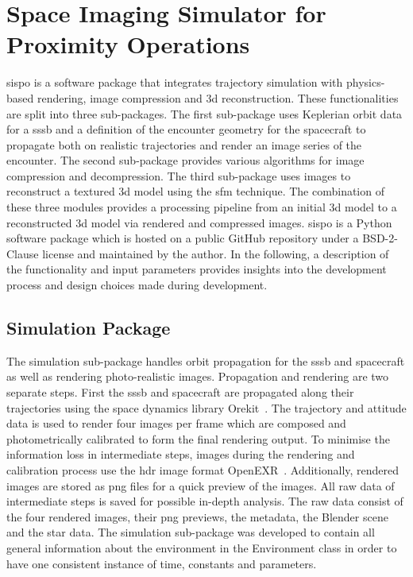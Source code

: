 \section{Space Imaging Simulator for Proximity Operations} \label{sec:sispo}
\gls{sispo} is a software package that integrates trajectory simulation with physics-based rendering, image compression and \gls{3d} reconstruction. These functionalities are split into three sub-packages. The first sub-package uses Keplerian orbit data for a \gls{sssb} and a definition of the encounter geometry for the spacecraft to propagate both on realistic trajectories and render an image series of the encounter. The second sub-package provides various algorithms for image compression and decompression. The third sub-package uses images to reconstruct a textured \gls{3d} model using the \gls{sfm} technique. The combination of these three modules provides a processing pipeline from an initial \gls{3d} model to a reconstructed \gls{3d} model via rendered and compressed images. \Gls{sispo} is a Python software package which is hosted on a public GitHub repository under a BSD-2-Clause license and maintained by the author\cite{Schwarzkopf2020SpaceOperations}. In the following, a description of the functionality and input parameters provides insights into the development process and design choices made during development.

\subsection{Simulation Package}
The simulation sub-package handles orbit propagation for the \gls{sssb} and spacecraft as well as rendering photo-realistic images. Propagation and rendering are two separate steps. First the \gls{sssb} and spacecraft are propagated along their trajectories using the space dynamics library Orekit~\cite{orekit}. The  trajectory and attitude data is used to render four images per frame which are composed and photometrically calibrated to form the final rendering output. To minimise the information loss in intermediate steps, images during the rendering and calibration process use the \gls{hdr} image format OpenEXR~\cite{openexr}. Additionally, rendered images are stored as \gls{png} files for a quick preview of the images. All raw data of intermediate steps is saved for possible in-depth analysis. The raw data consist of the four rendered images, their \gls{png} previews, the metadata, the Blender scene and the star data. The simulation sub-package was developed to contain all general information about the environment in the Environment class in order to have one consistent instance of time, constants and parameters.


